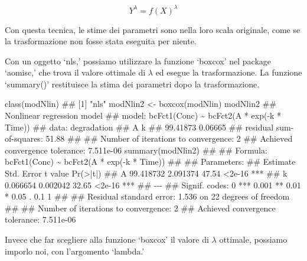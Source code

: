 \documentclass[a4paper,12pt,oneside]{book}
\newenvironment{Shaded}{\begin{snugshade}}{\end{snugshade}}
\newcommand{\DocumentationTok}[1]{#1}
\newcommand{\OtherTok}[1]{#1}
\newcommand{\FunctionTok}[1]{#1}
\newcommand{\NormalTok}[1]{#1}
\begin{document}
\[Y^\lambda  = f(X)^\lambda\]

Con questa tecnica, le stime dei parametri sono nella loro scala originale, come se la trasformazione non fosse stata eseguita per niente.

Con un oggetto `nls,' possiamo utilizzare la funzione `boxcox' nel package `aomisc,' che trova il valore ottimale di \(\lambda\) ed esegue la trasformazione. La funzione `summary()' restituisce la stima dei parametri dopo la trasformazione.

\begin{Shaded}
\begin{Highlighting}[]
\FunctionTok{class}\NormalTok{(modNlin)}
\DocumentationTok{\#\# [1] "nls"}
\NormalTok{modNlin2 }\OtherTok{\textless{}{-}} \FunctionTok{boxcox}\NormalTok{(modNlin)}
\NormalTok{modNlin2}
\DocumentationTok{\#\# Nonlinear regression model}
\DocumentationTok{\#\#   model: bcFct1(Conc) \textasciitilde{} bcFct2(A * exp({-}k * Time))}
\DocumentationTok{\#\#    data: degradation}
\DocumentationTok{\#\#        A        k }
\DocumentationTok{\#\# 99.41873  0.06665 }
\DocumentationTok{\#\#  residual sum{-}of{-}squares: 51.88}
\DocumentationTok{\#\# }
\DocumentationTok{\#\# Number of iterations to convergence: 2 }
\DocumentationTok{\#\# Achieved convergence tolerance: 7.511e{-}06}
\FunctionTok{summary}\NormalTok{(modNlin2)}
\DocumentationTok{\#\# }
\DocumentationTok{\#\# Formula: bcFct1(Conc) \textasciitilde{} bcFct2(A * exp({-}k * Time))}
\DocumentationTok{\#\# }
\DocumentationTok{\#\# Parameters:}
\DocumentationTok{\#\#    Estimate Std. Error t value Pr(\textgreater{}|t|)    }
\DocumentationTok{\#\# A 99.418732   2.091374   47.54   \textless{}2e{-}16 ***}
\DocumentationTok{\#\# k  0.066654   0.002042   32.65   \textless{}2e{-}16 ***}
\DocumentationTok{\#\# {-}{-}{-}}
\DocumentationTok{\#\# Signif. codes:  0 \textquotesingle{}***\textquotesingle{} 0.001 \textquotesingle{}**\textquotesingle{} 0.01 \textquotesingle{}*\textquotesingle{} 0.05 \textquotesingle{}.\textquotesingle{} 0.1 \textquotesingle{} \textquotesingle{} 1}
\DocumentationTok{\#\# }
\DocumentationTok{\#\# Residual standard error: 1.536 on 22 degrees of freedom}
\DocumentationTok{\#\# }
\DocumentationTok{\#\# Number of iterations to convergence: 2 }
\DocumentationTok{\#\# Achieved convergence tolerance: 7.511e{-}06}
\end{Highlighting}
\end{Shaded}

Invece che far scegliere alla funzione `boxcox' il valore di \(\lambda\) ottimale, possiamo imporlo noi, con l'argomento `lambda.'
\end{document}
